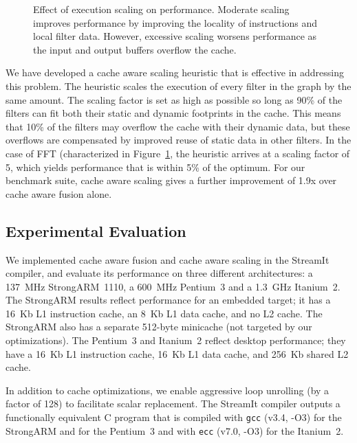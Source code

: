 \begin{figure}[t]
\centering
{}
\caption[Effect of execution scaling on performance]{Effect of execution 
scaling on performance.  Moderate scaling improves performance by
improving the locality of instructions and local filter data.
However, excessive scaling worsens performance as the input and output
buffers overflow the cache.\protect\label{fig:scaling}}
\end{figure}

We have developed a cache aware scaling heuristic that is effective in
addressing this problem.  The heuristic scales the execution of every
filter in the graph by the same amount.  The scaling factor is set as
high as possible so long as 90\% of the filters can fit both their
static and dynamic footprints in the cache.  This means that 10\% of
the filters may overflow the cache with their dynamic data, but these
overflows are compensated by improved reuse of static data in other
filters.  In the case of FFT (characterized in
Figure~\ref{fig:scaling}, the heuristic arrives at a scaling factor of
5, which yields performance that is within 5\% of the optimum.  For our
benchmark suite, cache aware scaling gives a further improvement of
1.9x over cache aware fusion alone.

\subsection*{Experimental Evaluation}

We implemented cache aware fusion and cache aware scaling in the
StreamIt compiler, and evaluate its performance on three different
architectures: a 137~MHz StrongARM~1110, a 600~MHz Pentium~3 and a
1.3~GHz Itanium~2. The StrongARM results reflect performance for an
embedded target; it has a 16~Kb L1 instruction cache, an 8~Kb L1 data
cache, and no L2 cache.  The StrongARM also has a separate 512-byte
minicache (not targeted by our optimizations).  The Pentium~3 and
Itanium~2 reflect desktop performance; they have a 16~Kb L1
instruction cache, 16~Kb L1 data cache, and 256~Kb shared L2 cache.

In addition to cache optimizations, we enable aggressive loop
unrolling (by a factor of 128) to facilitate scalar replacement.  The
StreamIt compiler outputs a functionally equivalent C program that is
compiled with \texttt{gcc} (v3.4, -O3) for the StrongARM and for the
Pentium~3 and with \texttt{ecc} (v7.0, -O3) for the Itanium~2.

